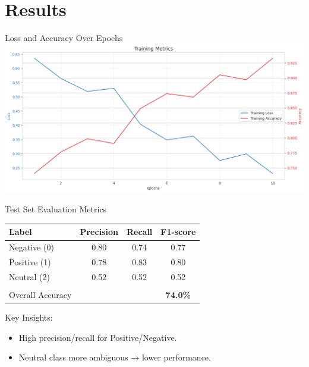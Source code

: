\documentclass[aspectratio=169]{beamer}
\begin{document}
\section{Results}
\begin{frame}{Loss and Accuracy Over Epochs}
  \centering
  \includegraphics[width=0.75\linewidth]{training_metrics.png}
\end{frame}

\begin{frame}{Test Set Evaluation Metrics}
  \vspace{-0.5em}
  {\small
    \begin{tabular}{lccc}
      Label            & Precision & Recall & F1-score     \\
      \hline
      Negative (0)     & 0.80      & 0.74   & 0.77         \\
      Positive (1)     & 0.78      & 0.83   & 0.80         \\
      Neutral (2)      & 0.52      & 0.52   & 0.52         \\
      \\[-0.8em]
      Overall Accuracy &           &        & {\bf 74.0\%} \\
    \end{tabular}}

  \vspace{1em}

  Key Insights:
  \begin{itemize}
    \item High precision/recall for Positive/Negative.
    \item Neutral class more ambiguous → lower performance.
  \end{itemize}
\end{frame}
\end{document}
